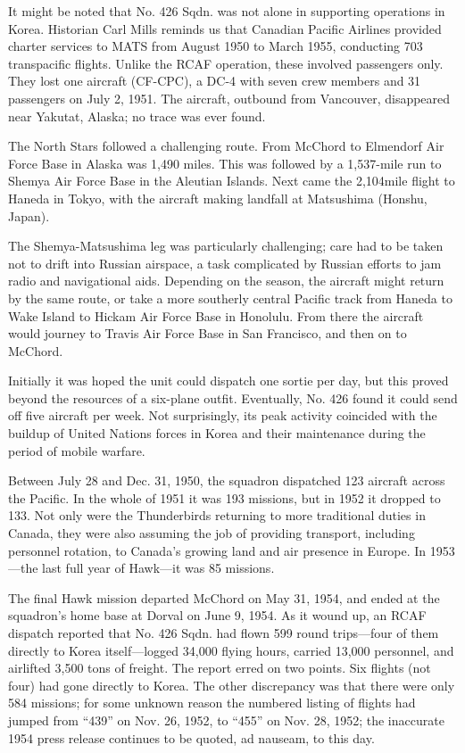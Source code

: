 It might be noted that No. 426 Sqdn. was not alone in supporting
operations in Korea. Historian Carl Mills reminds us that Canadian
Pacific Airlines provided charter services to MATS from August 1950 to
March 1955, conducting 703 transpacific flights. Unlike the RCAF
operation, these involved passengers only. They lost one aircraft
(CF-CPC), a DC-4 with seven crew members and 31 passengers on July 2,
1951. The aircraft, outbound from Vancouver, disappeared near
Yakutat, Alaska; no trace was ever found.

The North Stars followed a challenging route. From McChord to
Elmendorf Air Force Base in Alaska was 1,490 miles. This was followed
by a 1,537-mile run to Shemya Air Force Base in the Aleutian
Islands. Next came the 2,104mile flight to Haneda in Tokyo, with the
aircraft making landfall at Matsushima (Honshu, Japan).

The Shemya-Matsushima leg was particularly challenging; care had to
be taken not to drift into Russian airspace, a task complicated by
Russian efforts to jam radio and navigational aids. Depending on the
season, the aircraft might return by the same route, or take a more
southerly central Pacific track from Haneda to Wake Island to Hickam
Air Force Base in Honolulu. From there the aircraft would journey to
Travis Air Force Base in San Francisco, and then on to McChord.

Initially it was hoped the unit could dispatch one sortie per day, but
this proved beyond the resources of a six-plane outfit. Eventually,
No. 426 found it could send off five aircraft per week. Not
surprisingly, its peak activity coincided with the buildup of United
Nations forces in Korea and their maintenance during the period of
mobile warfare.

Between July 28 and Dec. 31, 1950, the squadron dispatched 123
aircraft across the Pacific. In the whole of 1951 it was 193 missions,
but in 1952 it dropped to 133. Not only were the Thunderbirds
returning to more traditional duties in Canada, they were also
assuming the job of providing transport, including personnel
rotation, to Canada’s growing land and air presence in Europe. In
1953—the last full year of Hawk—it was 85 missions.

The final Hawk mission departed McChord on May 31, 1954, and ended at
the squadron’s home base at Dorval on June 9, 1954. As it wound up, an
RCAF dispatch reported that No. 426 Sqdn. had flown 599 round
trips—four of them directly to Korea itself—logged 34,000 flying
hours, carried 13,000 personnel, and airlifted 3,500 tons of
freight. The report erred on two points. Six flights (not four) had
gone directly to Korea. The other discrepancy was that there were
only 584 missions; for some unknown reason the numbered listing of
flights had jumped from “439” on Nov. 26, 1952, to “455” on Nov. 28,
1952; the inaccurate 1954 press release continues to be quoted, ad
nauseam, to this day.

